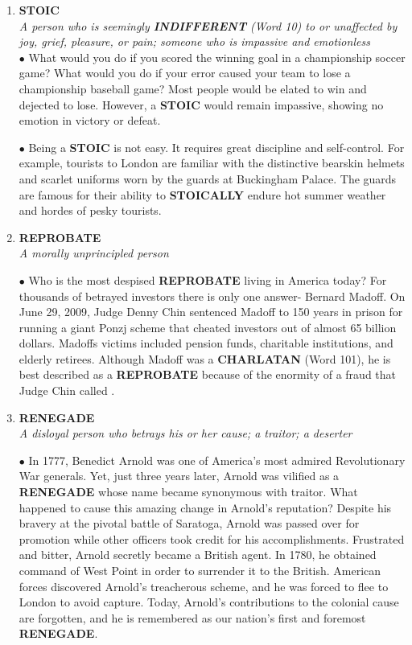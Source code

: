 \documentclass{book}
\begin{document}
\begin{enumerate}
\item \textbf{STOIC}\\
\textit{A person who is seemingly \textbf{INDIFFERENT}
(Word 10) to or unaffected by joy, grief,
pleasure, or  pain; someone who is impassive
and emotionless}\\

$ \bullet $ What would you do if you scored the winning goal in a
championship soccer game? What would you do if
your error caused your team to lose a championship
baseball game? Most people would be elated to win
and dejected to lose. However, a \textbf{STOIC} would remain
impassive, showing no emotion in victory or defeat.

$ \bullet $ Being a \textbf{STOIC} is not easy. It requires great discipline
and self-control. For example, tourists to London are
familiar with the distinctive bearskin helmets and
scarlet uniforms worn by the guards at Buckingham
Palace. The guards are famous for their ability to
\textbf{STOICALLY} endure hot summer weather and hordes
of pesky tourists.

\item \textbf{REPROBATE}\\
\textit{A morally unprincipled person}

$ \bullet $ Who is the most despised \textbf{REPROBATE} living in
America today? For thousands of betrayed investors
there is only one answer- Bernard Madoff. On June
29, 2009, Judge Denny Chin sentenced Madoff to 150
years in prison for running a giant Ponzj scheme that
cheated investors out of almost 65 billion dollars.
Madoffs victims included pension funds, charitable
institutions, and elderly retirees. Although Madoff
was a \textbf{CHARLATAN} (Word 101), he is best described
as a \textbf{REPROBATE} because of the enormity of a fraud
that Judge Chin called .

\item \textbf{RENEGADE}\\
\textit{A disloyal person who betrays his or her cause; a traitor; a deserter}

$ \bullet $ In 1777, Benedict Arnold was one of America's most
admired Revolutionary War generals. Yet, just three
years later, Arnold was vilified as a \textbf{RENEGADE}
whose name became synonymous with traitor. What
happened to cause this amazing change in Arnold's
reputation? Despite his bravery at the pivotal battle of
Saratoga, Arnold was passed over for promotion while
other officers took credit for his accomplishments.
Frustrated and bitter, Arnold secretly became a
British agent. In 1780, he obtained command of West
Point in order to surrender it to the British. American
forces discovered Arnold's treacherous scheme, and
he was forced to flee to London to avoid capture.
Today, Arnold's contributions to the colonial cause
are forgotten, and he is remembered as our nation's
first and foremost \textbf{RENEGADE}.


\end{enumerate}
\end{document}
